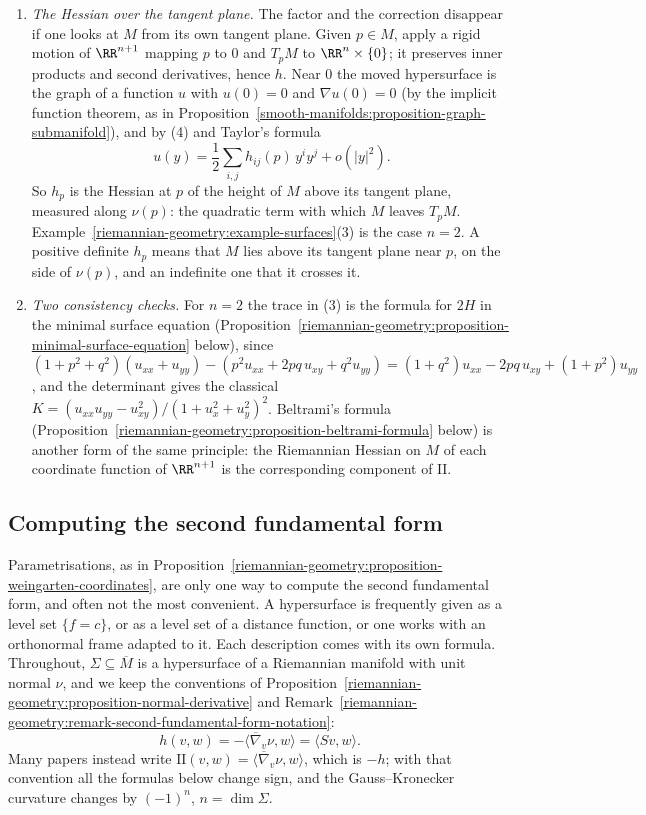 \begin{remark}
\begin{enumerate}
\item \emph{The Hessian over the tangent plane.} The factor and the correction disappear if one looks at $M$ from its own tangent plane. Given $p \in M$, apply a rigid motion of $\RR^{n+1}$ mapping $p$ to $0$ and
$T_pM$ to $\RR^n \times \{0\}$; it preserves inner products and second derivatives, hence $h$. Near $0$ the moved hypersurface is the graph of a function $u$ with $u(0) = 0$ and $\nabla u(0) = 0$ (by the implicit
function theorem, as in Proposition~\ref{smooth-manifolds:proposition-graph-submanifold}), and by (4) and Taylor's formula
\[
u(y) = \frac12\sum_{i,j}h_{ij}(p)\,y^iy^j + o(|y|^2) .
\]
So $h_p$ is the Hessian at $p$ of the height of $M$ above its tangent plane, measured along $\nu(p)$: the quadratic term with which $M$ leaves $T_pM$. Example~\ref{riemannian-geometry:example-surfaces}(3) is the case
$n = 2$. A positive definite $h_p$ means that $M$ lies above its tangent plane near $p$, on the side of $\nu(p)$, and an indefinite one that it crosses it.
\item \emph{Two consistency checks.} For $n = 2$ the trace in (3) is the formula for $2H$ in the minimal surface equation (Proposition~\ref{riemannian-geometry:proposition-minimal-surface-equation} below), since
$(1 + p^2 + q^2)(u_{xx} + u_{yy}) - (p^2u_{xx} + 2pq\,u_{xy} + q^2u_{yy}) = (1 + q^2)u_{xx} - 2pq\,u_{xy} + (1 + p^2)u_{yy}$, and the determinant gives the classical
$K = (u_{xx}u_{yy} - u_{xy}^2)/(1 + u_x^2 + u_y^2)^2$. Beltrami's formula (Proposition~\ref{riemannian-geometry:proposition-beltrami-formula} below) is another form of the same principle: the Riemannian Hessian
on $M$ of each coordinate function of $\RR^{n+1}$ is the corresponding component of $\mathrm{II}$.
\end{enumerate}
\end{remark}

\subsection{Computing the second fundamental form}\label{riemannian-geometry:subsection-computing-second-fundamental-form}

Parametrisations, as in Proposition~\ref{riemannian-geometry:proposition-weingarten-coordinates}, are only one way to compute the second fundamental form, and often not the most convenient. A hypersurface
is frequently given as a level set $\{f = c\}$, or as a level set of a distance function, or one works with an orthonormal frame adapted to it. Each description comes with its own formula. Throughout,
$\Sigma \subseteq \overline{M}$ is a hypersurface of a Riemannian manifold with unit normal $\nu$, and we keep the conventions of Proposition~\ref{riemannian-geometry:proposition-normal-derivative} and Remark~\ref{riemannian-geometry:remark-second-fundamental-form-notation}:
\[
h(v, w) = -\langle\overline{\nabla}_v\nu, w\rangle = \langle S v, w\rangle .
\]
Many papers instead write $\mathrm{II}(v, w) = \langle\overline{\nabla}_v\nu, w\rangle$, which is $-h$; with that convention all the formulas below change sign, and the Gauss--Kronecker curvature changes by
$(-1)^n$, $n = \dim\Sigma$.

